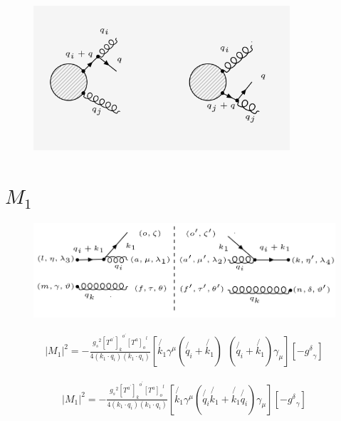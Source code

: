
\begin{figure}[ht!]
\centering
\includegraphics[width=0.85\textwidth]{images/GQ/GQDiagrams.png}
\end{figure}

\pagebreak

\section{$ M_1 $}
\begin{figure}[ht!]
\centering
\includegraphics[scale=0.7]{images/GQ/M1Squer.png}
\end{figure}

\begin{equation}
\begin{split}
|M_1|^2=-\frac{{g_s}^2 {[T^{a^{\prime}}]_k}^{o^{\prime}} {[T^a]_{o}}^{l}}{4(k_1 \cdot q_i)(k_1 \cdot q_i)}[\not{k_1}{\gamma}^{\mu}(\not{q_i}+\not{k_1})\:\:(\not{q_i}+\not{k_1}) {\gamma}_{{\mu}}][-{g^{\delta}}_{\gamma}]
\end{split}
\end{equation}

\begin{equation}
\begin{split}
|M_1|^2=-\frac{{g_s}^2 {[T^{a^{\prime}}]_k}^{o^{\prime}} {[T^a]_{o}}^{l}}{4(k_1 \cdot q_i)(k_1 \cdot q_i)}[\not{k_1}{\gamma}^{\mu}(\not{q_i}\not{k_1}+\not{k_1}\not{q_i}) {\gamma}_{{\mu}}][-{g^{\delta}}_{\gamma}]
\end{split}
\end{equation}

